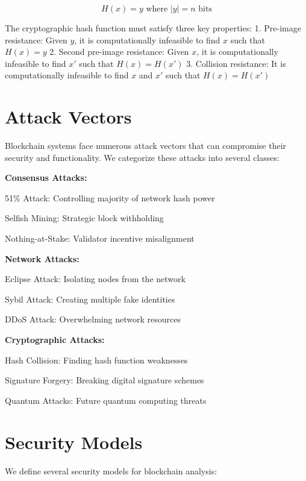 \documentclass{article}
\begin{document}
{\begin{equation}
H(x) = y \text{ where } |y| = n \text{ bits}
\end{equation}

The cryptographic hash function must satisfy three key properties:
1. Pre-image resistance: Given $y$, it is computationally infeasible to find $x$ such that $H(x) = y$
2. Second pre-image resistance: Given $x$, it is computationally infeasible to find $x'$ such that $H(x) = H(x')$
3. Collision resistance: It is computationally infeasible to find $x$ and $x'$ such that $H(x) = H(x')$

\section{Attack Vectors}
Blockchain systems face numerous attack vectors that can compromise their security and functionality. We categorize these attacks into several classes:

\textbf{Consensus Attacks:}

\item 51\% Attack: Controlling majority of network hash power

\item Selfish Mining: Strategic block withholding

\item Nothing-at-Stake: Validator incentive misalignment

\textbf{Network Attacks:}

\item Eclipse Attack: Isolating nodes from the network

\item Sybil Attack: Creating multiple fake identities

\item DDoS Attack: Overwhelming network resources

\textbf{Cryptographic Attacks:}

\item Hash Collision: Finding hash function weaknesses

\item Signature Forgery: Breaking digital signature schemes

\item Quantum Attacks: Future quantum computing threats

\section{Security Models}
We define several security models for blockchain analysis:

}
\end{document}
